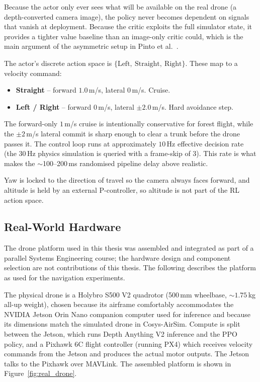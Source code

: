 \documentclass[../main.tex]{subfiles}
\begin{document}
Because the actor only ever sees what will be available on the real drone (a depth-converted camera image), the policy never becomes dependent on signals that vanish at deployment. Because the critic exploits the full simulator state, it provides a tighter value baseline than an image-only critic could, which is the main argument of the asymmetric setup in Pinto et al.\ \cite{Pinto2017}.

The actor's discrete action space is $\{\text{Left},\ \text{Straight},\ \text{Right}\}$. These map to a velocity command:

\begin{itemize}
  \item \textbf{Straight} -- forward $1.0$\,m/s, lateral $0$\,m/s. Cruise.
  \item \textbf{Left / Right} -- forward $0$\,m/s, lateral $\pm 2.0$\,m/s. Hard avoidance step.
\end{itemize}

The forward-only $1$\,m/s cruise is intentionally conservative for forest flight, while the $\pm 2$\,m/s lateral commit is sharp enough to clear a trunk before the drone passes it. The control loop runs at approximately $10$\,Hz effective decision rate (the $30$\,Hz physics simulation is queried with a frame-skip of 3). This rate is what makes the $\sim$100--200\,ms randomised pipeline delay above realistic.

Yaw is locked to the direction of travel so the camera always faces forward, and altitude is held by an external P-controller, so altitude is not part of the RL action space.



\subsection{Real-World Hardware}

The drone platform used in this thesis was assembled and integrated as part of a parallel Systems Engineering course; the hardware design and component selection are not contributions of this thesis. The following describes the platform as used for the navigation experiments.

The physical drone is a Holybro S500 V2 quadrotor (500\,mm wheelbase, $\sim 1.75$\,kg all-up weight), chosen because its airframe comfortably accommodates the NVIDIA Jetson Orin Nano companion computer used for inference and because its dimensions match the simulated drone in Cosys-AirSim. Compute is split between the Jetson, which runs Depth Anything V2 inference and the PPO policy, and a Pixhawk 6C flight controller (running PX4) which receives velocity commands from the Jetson and produces the actual motor outputs. The Jetson talks to the Pixhawk over MAVLink. The assembled platform is shown in Figure~\ref{fig:real_drone}.
\end{document}
